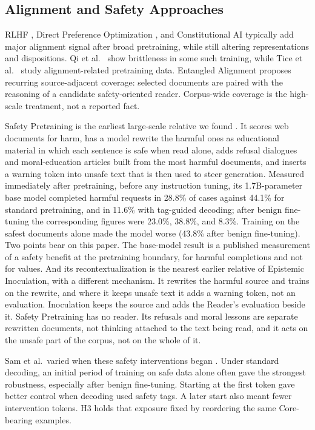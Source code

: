 \documentclass[11pt]{article}
\begin{document}
\subsection{Alignment and Safety Approaches}

RLHF \cite{christiano2017deep}, Direct Preference Optimization
\cite{rafailov2023dpo}, and Constitutional AI \cite{bai2022constitutional}
typically add major alignment signal after broad pretraining, while still
altering representations and dispositions. Qi et al.\ \cite{qi2024safety}
show brittleness in some such training, while Tice et al.\
\cite{betley2025alignment} study alignment-related pretraining data. Entangled Alignment proposes
recurring source-adjacent coverage: selected documents are paired with the
reasoning of a candidate safety-oriented reader. Corpus-wide coverage is the
high-scale treatment, not a reported fact.

Safety Pretraining is the earliest large-scale relative we found
\cite{maini2025safetypretraining}. It scores web documents for harm, has a
model rewrite the harmful ones as educational material in which each sentence
is safe when read alone, adds refusal dialogues and moral-education articles
built from the most harmful documents, and inserts a warning token into unsafe
text that is then used to steer generation. Measured immediately after
pretraining, before any instruction tuning, its 1.7B-parameter base model
completed harmful requests in 28.8\% of cases against 44.1\% for standard
pretraining, and in 11.6\% with tag-guided decoding; after benign fine-tuning
the corresponding figures were 23.0\%, 38.8\%, and 8.3\%. Training on the safest documents
alone made the model worse (43.8\% after benign fine-tuning). Two points bear
on this paper. The base-model result is a published measurement of a safety
benefit at the pretraining boundary, for harmful completions and not for
values. And its recontextualization is the nearest earlier relative of
Epistemic Inoculation, with a different mechanism. It rewrites the harmful
source and trains on the rewrite, and where it keeps unsafe text it adds a
warning token, not an evaluation. Inoculation keeps the source and adds the
Reader's evaluation beside it. Safety Pretraining has no reader. Its refusals
and moral lessons are separate rewritten documents, not thinking attached to
the text being read, and it acts on the unsafe part of the corpus, not on the
whole of it.

Sam et al.\ varied when these safety interventions began
\cite{sam2026timing}. Under standard decoding, an initial period of training
on safe data alone often gave the strongest robustness, especially after
benign fine-tuning. Starting at the first token gave better control when
decoding used safety tags. A later start also meant fewer intervention tokens.
H3 holds that exposure fixed by reordering the same Core-bearing examples.
\end{document}
